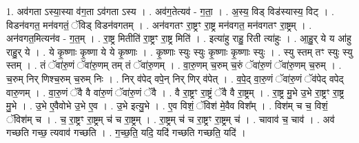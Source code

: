 \documentclass[17pt]{extarticle}
\begin{document}
1. अव॑गता ऽस्या॒स्या व॑ग॒ता ऽव॑गता ऽस्य । . अव॑ग॒तेत्यव॑ - ग॒ता॒ । . अ॒स्य॒ विड् विड॑स्यास्य॒ विट् । . विडन॑वगत॒ मन॑वगतं॒ ॅविड् विडन॑वगतम् । . अन॑वगतꣳ रा॒ष्ट्रꣳ रा॒ष्ट्र मन॑वगत॒ मन॑वगतꣳ रा॒ष्ट्रम् । . अन॑वगत॒मित्यन॑व - ग॒त॒म् । . रा॒ष्ट्र मितीति॑ रा॒ष्ट्रꣳ रा॒ष्ट्र मिति॑ । . इत्या॑हु राहु॒ रिती त्या॑हुः । . आ॒हु॒र् ये य आ॑हु राहु॒र् ये । . ये कृ॒ष्णाः कृ॒ष्णा ये ये कृ॒ष्णाः । . कृ॒ष्णाः स्युः स्युः कृ॒ष्णाः कृ॒ष्णाः स्युः । . स्यु स्तम् तꣳ स्युः स्यु स्तम् । . तं ॅवा॑रु॒णं ॅवा॑रु॒णम् तम् तं ॅवा॑रु॒णम् । . वा॒रु॒णम् च॒रुम् च॒रुं ॅवा॑रु॒णं ॅवा॑रु॒णम् च॒रुम् । . च॒रुम् निर् णिश्च॒रुम् च॒रुम् निः । . निर् व॑पेद् वपे॒न् निर् णिर् व॑पेत् । . व॒पे॒द् वा॒रु॒णं ॅवा॑रु॒णं ॅव॑पेद् वपेद् वारु॒णम् । . वा॒रु॒णं ॅवै वै वा॑रु॒णं ॅवा॑रु॒णं ॅवै । . वै रा॒ष्ट्रꣳ रा॒ष्ट्रं ॅवै वै रा॒ष्ट्रम् । . रा॒ष्ट्र मु॒भे उ॒भे रा॒ष्ट्रꣳ रा॒ष्ट्र मु॒भे । . उ॒भे ए॒वैवोभे उ॒भे ए॒व । . उ॒भे इत्यु॒भे । . ए॒व विशं॒ ॅविश॑ मे॒वैव विश᳚म् । . विश॑म् च च॒ विशं॒ ॅविश॑म् च । . च॒ रा॒ष्ट्रꣳ रा॒ष्ट्रम् च॑ च रा॒ष्ट्रम् । . रा॒ष्ट्रम् च॑ च रा॒ष्ट्रꣳ रा॒ष्ट्रम् च॑ । . चावाव॑ च॒ चाव॑ । . अव॑ गच्छति गच्छ॒ त्यवाव॑ गच्छति । . ग॒च्छ॒ति॒ यदि॒ यदि॑ गच्छति गच्छति॒ यदि॑ । \newline
\end{document}
